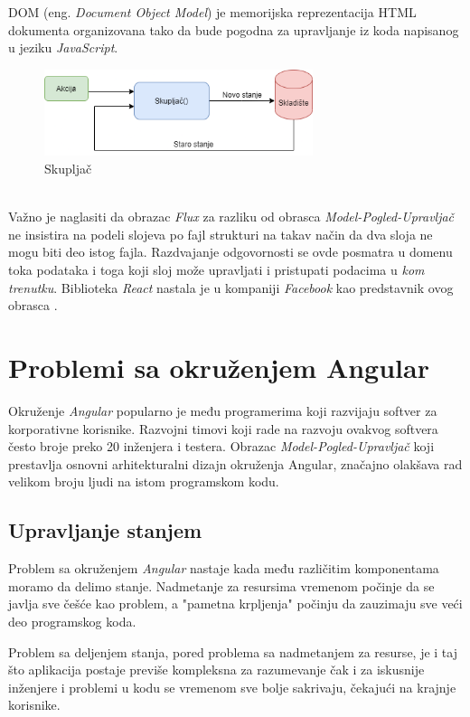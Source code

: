 \documentclass[12pt,oneside]{memoir}
\begin{document}
DOM (eng. \emph{Document Object Model}) je memorijska reprezentacija HTML dokumenta organizovana tako
da bude pogodna za upravljanje iz koda napisanog u jeziku \emph{JavaScript}. 
\begin{figure}[!ht]
  \centering
  \includegraphics[width=0.7\textwidth]{slike/Reducer.png}
  \caption{Skupljač}
  \label{fig:reducer}
\end{figure}
\\
Važno je naglasiti da obrazac \emph{Flux} za razliku od obrasca \emph{Model-Pogled-Upravljač} ne insistira
na podeli slojeva po fajl strukturi na takav način da dva sloja ne mogu biti deo istog fajla.
Razdvajanje odgovornosti se ovde posmatra u domenu toka podataka i toga koji sloj može
upravljati i pristupati podacima u \emph{kom trenutku}. Biblioteka \emph{React} nastala je u kompaniji \emph{Facebook} kao predstavnik ovog obrasca \cite{React}.

\section{Problemi sa okruženjem Angular}
Okruženje \emph{Angular} popularno je među programerima koji razvijaju softver za korporativne korisnike.
Razvojni timovi koji rade na razvoju ovakvog softvera često broje preko 20 inženjera i testera.
Obrazac \emph{Model-Pogled-Upravljač} koji prestavlja osnovni arhitekturalni dizajn okruženja Angular,
značajno olakšava rad velikom broju ljudi na istom programskom kodu.
\subsection{Upravljanje stanjem} \label{subsec:upravljanje-stanjem}

Problem sa okruženjem \emph{Angular} nastaje kada među različitim komponentama moramo da delimo stanje.
Nadmetanje za resursima vremenom počinje da se javlja sve češće kao problem, a "pametna krpljenja" počinju
da zauzimaju sve veći deo programskog koda.

Problem sa deljenjem stanja, pored problema sa nadmetanjem za resurse, je i taj što aplikacija postaje previše kompleksna
za razumevanje čak i za iskusnije inženjere i problemi u kodu se vremenom sve bolje sakrivaju,
čekajući na krajnje korisnike.
\end{document}
